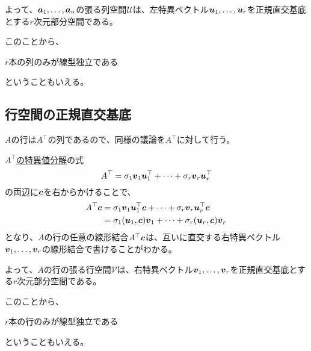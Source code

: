 \documentclass[../../../topic_linear-algebra]{subfiles}
\begin{document}
\br

よって、$\vb*{a}_1,\ldots,\vb*{a}_n$の張る列空間$\mathcal{U}$は、左特異ベクトル$\vb*{u}_1,\ldots,\vb*{u}_r$を正規直交基底とする$r$次元部分空間である。

\br

このことから、
\begin{emphabox}
  \begin{spacebox}
    \begin{center}
      $r$本の列のみが線型独立である
    \end{center}
  \end{spacebox}
\end{emphabox}
ということもいえる。

\subsection{行空間の正規直交基底}

$A$の行は$A^\top$の列であるので、同様の議論を$A^\top$に対して行う。

\br

\hyperref[sec:svd-of-transpose-A]{$A^\top$の特異値分解}の式
\begin{equation*}
  A^\top = \sigma_1\vb*{v}_1\vb*{u}_1^\top + \cdots + \sigma_r \vb*{v}_r \vb*{u}_r^\top
\end{equation*}
の両辺に$\vb*{c}$を右からかけることで、
\begin{align*}
  A^\top \vb*{c} & = \sigma_1\vb*{v}_1\vb*{u}_1^\top \vb*{c} + \cdots + \sigma_r \vb*{v}_r \vb*{u}_r^\top \vb*{c} \\
                 & = \sigma_1 (\vb*{u}_1, \vb*{c}) \vb*{v}_1 + \cdots + \sigma_r (\vb*{u}_r, \vb*{c}) \vb*{v}_r
\end{align*}
となり、$A$の行の任意の線形結合$A^\top \vb*{c}$は、互いに直交する右特異ベクトル$\vb*{v}_1,\ldots,\vb*{v}_r$の線形結合で書けることがわかる。

\br

よって、$A$の行の張る行空間$\mathcal{V}$は、右特異ベクトル$\vb*{v}_1,\ldots,\vb*{v}_r$を正規直交基底とする$r$次元部分空間である。

\br

このことから、
\begin{emphabox}
  \begin{spacebox}
    \begin{center}
      $r$本の行のみが線型独立である
    \end{center}
  \end{spacebox}
\end{emphabox}
ということもいえる。
\end{document}
